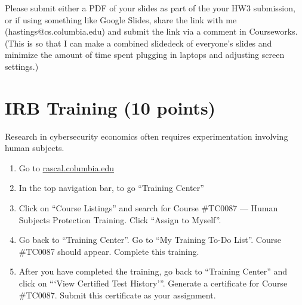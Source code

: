 \documentclass[11pt]{article}
\begin{document}
\noindent Please submit either a PDF of your slides as part of the your HW3 submission, or if using something like Google Slides, share the link with me (hastings@cs.columbia.edu) and submit the link via a comment in Courseworks. (This is so that I can make a combined slidedeck of everyone's slides and minimize the amount of time spent plugging in laptops and adjusting screen settings.)




\section*{IRB Training (10 points)}

Research in cybersecurity economics often requires experimentation involving human subjects. 

\begin{enumerate}
    \item Go to \href{rascal.columbia.edu}{rascal.columbia.edu}
    \item In the top navigation bar, to go ``Training Center''
    \item Click on ``Course Listings'' and search for Course \#TC0087 --- Human Subjects Protection Training. Click ``Assign to Myself''.
    \item Go back to ``Training Center''. Go to ``My Training To-Do List''. Course \#TC0087 should appear. Complete this training.
    \item After you have completed the training, go back to ``Training Center'' and click on ```View Certified Test History'''. Generate a certificate for Course \#TC0087. Submit this certificate as your assignment.
\end{enumerate}
\end{document}
